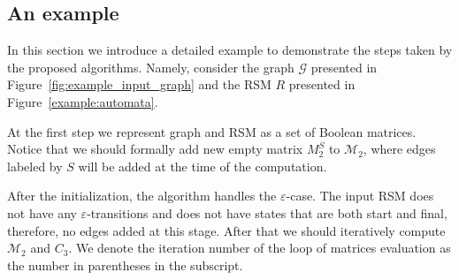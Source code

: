 \subsection{An example}
\label{example:section}
In this section we introduce a detailed example to demonstrate the steps taken by the proposed algorithms.
Namely, consider the graph $\mathcal{G}$ presented in Figure~\ref{fig:example_input_graph} and the RSM $R$ presented in Figure~\ref{example:automata}.

At the first step we represent graph and RSM as a set of Boolean matrices.
Notice that we should formally add new empty matrix $M_2^{S}$ to $\mathcal{M}_2$,
where edges labeled by $S$ will be added at the time of the computation.

After the initialization, the algorithm handles the $\varepsilon$-case.
The input RSM does not have any $\varepsilon$-transitions and does not have states
that are both start and final, therefore, no edges added at this stage.
After that we should iteratively compute $\mathcal{M}_2$ and $C_3$.
We denote the iteration number of the loop of matrices evaluation as the number in parentheses in the subscript.

